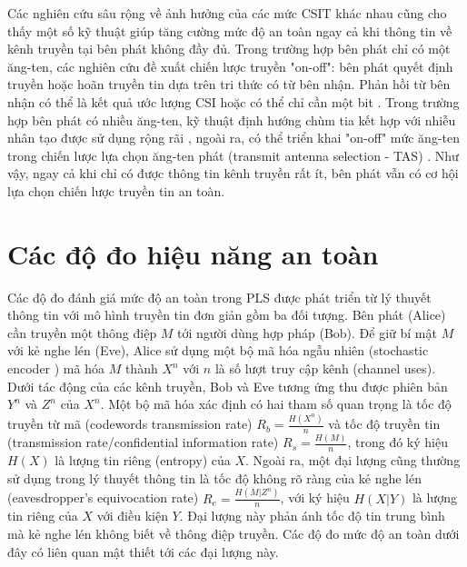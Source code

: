 \documentclass[../main.tex]{subfiles}
\begin{document}
Các nghiên cứu sâu rộng về ảnh hưởng của các mức CSIT khác nhau cũng cho thấy một số kỹ thuật giúp tăng cường mức độ an toàn ngay cả khi thông tin về kênh truyền tại bên phát không đầy đủ. Trong trường hợp bên phát chỉ có một ăng-ten, các nghiên cứu \cite{he2013secure,zhou2011,gopala2008secrecy,rezki2011ergodic,he2016secrecy} đề xuất chiến lược truyền "on-off": bên phát quyết định truyền hoặc hoãn truyền tin dựa trên tri thức có từ bên nhận. Phản hồi từ bên nhận có thể là kết quả ước lượng CSI \cite{gopala2008secrecy,he2013secure,zhou2011,rezki2011ergodic} hoặc có thể chỉ cần một bit \cite{he2016secrecy,zhou2011}. Trong trường hợp bên phát có nhiều ăng-ten, kỹ thuật định hướng chùm tia kết hợp với nhiễu nhân tạo được sử dụng rộng rãi \cite{goel2008guaranteeing,zhang2013design}, ngoài ra, có thể triển khai "on-off" mức ăng-ten trong chiến lược lựa chọn ăng-ten phát (transmit antenna selection - TAS) \cite{alves2016enhanced}. Như vậy, ngay cả khi chỉ có được thông tin kênh truyền rất ít, bên phát vẫn có cơ hội lựa chọn chiến lược truyền tin an toàn.

\section{Các độ đo hiệu năng an toàn}

Các độ đo đánh giá mức độ an toàn trong PLS được phát triển từ lý thuyết thông tin với mô hình truyền tin đơn giản gồm ba đối tượng. Bên phát (Alice) cần truyền một thông điệp $M$ tới người dùng hợp pháp (Bob). Để giữ bí mật $M$ với kẻ nghe lén (Eve), Alice sử dụng một bộ mã hóa ngẫu nhiên (stochastic encoder \cite{wyner}) mã hóa $M$ thành $X^n$ với $n$ là số lượt truy cập kênh (channel uses). Dưới tác động của các kênh truyền, Bob và Eve tương ứng thu được phiên bản $Y^n$ và $Z^n$ của $X^n$. Một bộ mã hóa xác định có hai tham số quan trọng là tốc độ truyền từ mã (codewords transmission rate) $R_b = \frac{H\left(X^n\right)}{n}$ và tốc độ truyền tin (transmission rate/confidential information rate) $R_s = \frac{H\left(M\right)}{n}$, trong đó ký hiệu $H(X)$ là lượng tin riêng (entropy) của $X$. Ngoài ra, một đại lượng cũng thường sử dụng trong lý thuyết thông tin là tốc độ không rõ ràng của kẻ nghe lén (eavesdropper's equivocation rate) $R_e = \frac{H\left(M | Z^n\right)}{n}$, với ký hiệu $H(X|Y)$ là lượng tin riêng của $X$ với điều kiện $Y$. Đại lượng này phản ánh tốc độ tin trung bình mà kẻ nghe lén không biết về thông điệp truyền. Các độ đo mức độ an toàn dưới đây có liên quan mật thiết tới các đại lượng này.
\end{document}
